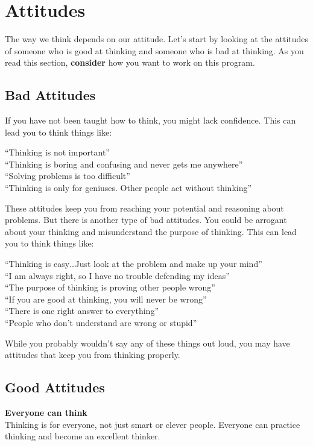 
\chapter{Attitudes}

The way we think depends on our attitude. Let's start by looking at the attitudes of someone who is good at thinking and someone who is bad at thinking. As you read this section, \textbf{consider} how you want to work on this program.

\section*{Bad Attitudes}

If you have not been taught how to think, you might lack confidence. This can lead you to think things like:

``Thinking is not important'' \\
``Thinking is boring and confusing and never gets me anywhere'' \\
``Solving problems is too difficult'' \\
``Thinking is only for geniuses. Other people act without thinking''

These attitudes keep you from reaching your potential and reasoning about problems. But there is another type of bad attitudes. You could be arrogant about your thinking and misunderstand the purpose of thinking. This can lead you to think things like:

``Thinking is easy\ldots Just look at the problem and make up your mind'' \\
``I am always right, so I have no trouble defending my ideas'' \\
``The purpose of thinking is proving other people wrong'' \\
``If you are good at thinking, you will never be wrong'' \\
``There is one right answer to everything'' \\
``People who don't understand are wrong or stupid''

While you probably wouldn't say any of these things out loud, you may have attitudes that keep you from thinking properly.


\section*{Good Attitudes}

\textbf{Everyone can think} \\
Thinking is for everyone, not just smart or clever people. Everyone can practice thinking and become an excellent thinker.

